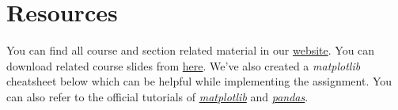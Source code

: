 \documentclass[a4paper]{article}
\begin{document}
\newpage

\section{Resources}
You can find all course and section related material in our \href{https://koltpython.com}{website}. You can download related course slides from \href{https://github.com/koltpython/python-workshops/raw/master/4-Introduction-to-Pandas-and-Matplotlib/pandas_matplotlib_presentation.pdf}{here}. We've also created a \textit{matplotlib} cheatsheet below which can be helpful while implementing the assignment. You can also refer to the official tutorials of \href{https://matplotlib.org/tutorials/index.html}{\textit{matplotlib}} and \href{https://pandas.pydata.org/pandas-docs/stable/reference/index.html}{\textit{pandas}}. 
\end{document}
